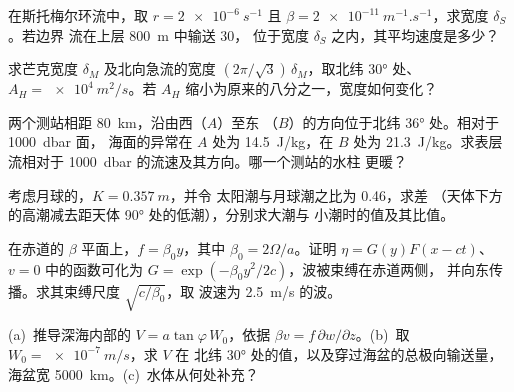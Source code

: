 \begin{exercise}[$\star\star$]\label{exo:b3:ocean-dynamics:6}
在斯托梅尔环流中，取 $r = \qty{2e-6}{s^{-1}}$ 且 $\beta =
\qty{2e-11}{m^{-1}.s^{-1}}$，求宽度 $\delta_S$。若边界
流在上层 \qty{800}{m} 中输送 \qty{30}{\sverdrup}，
位于宽度 $\delta_S$ 之内，其平均速度是多少？
\end{exercise}

\begin{exercise}[$\star\star$]\label{exo:b3:ocean-dynamics:7}
求芒克宽度 $\delta_M$ 及北向急流的宽度
$(2\pi/\sqrt3)\,\delta_M$，取北纬 \ang{30} 处、$A_H = \qty{e4}{m^2/s}$。若
$A_H$ 缩小为原来的八分之一，宽度如何变化？
\end{exercise}

\begin{exercise}[$\star\star$]\label{exo:b3:ocean-dynamics:8}
两个测站相距 \qty{80}{km}，沿由西（$A$）至东
（$B$）的方向位于北纬 \ang{36} 处。相对于 \qty{1000}{dbar} 面，
海面的异常在 $A$ 处为 \qty{14.5}{J/kg}，在
$B$ 处为 \qty{21.3}{J/kg}。求表层流相对于
\qty{1000}{dbar} 的流速及其方向。哪一个测站的水柱
更暖？
\end{exercise}

\begin{exercise}[$\star\star$]\label{exo:b3:ocean-dynamics:9}
考虑月球的，$K = \qty{0.357}{m}$，并令
太阳潮与月球潮之比为 \num{0.46}，求差
（天体下方的高潮减去距天体 \ang{90} 处的低潮），分别求大潮与
小潮时的值及其比值。
\end{exercise}

\begin{exercise}[$\star\star\star$]\label{exo:b3:ocean-dynamics:10}
在赤道的 $\beta$ 平面上，$f = \beta_0y$，其中 $\beta_0 =
2\Omega/a$。证明 $\eta = G(y)F(x - ct)$、$v = 0$ 中的函数可化为
$G = \exp(-\beta_0y^2/2c)$，波被束缚在赤道两侧，
并向东传播。求其束缚尺度 $\sqrt{c/\beta_0}$，取
波速为 \qty{2.5}{m/s} 的波。
\end{exercise}

\begin{exercise}[$\star\star\star$]\label{exo:b3:ocean-dynamics:11}
(a)~推导深海内部的 $V = a\tan\varphi\,W_0$，依据 $\beta v =
f\,\partial w/\partial z$。(b)~取 $W_0 = \qty{e-7}{m/s}$，求 $V$ 在
北纬 \ang{30} 处的值，以及穿过海盆的总极向输送量，
海盆宽 \qty{5000}{km}。(c)~水体从何处补充？
\end{exercise}

